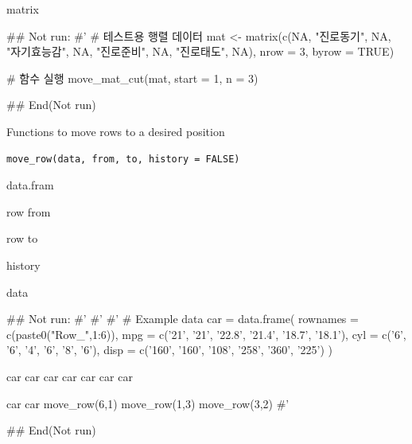 \documentclass[a4paper]{book}
\begin{document}
%
\begin{Value}
matrix
\end{Value}
%
\begin{Examples}
\begin{ExampleCode}

\#\# Not run: 
#'
# 테스트용 행렬 데이터
mat <- matrix(c(NA, "진로동기", NA, "자기효능감", NA,
    "진로준비", NA, "진로태도", NA), nrow = 3, byrow = TRUE)

# 함수 실행
move_mat_cut(mat, start = 1, n = 3)


## End(Not run)


\end{ExampleCode}
\end{Examples}
%
\begin{Description}
Functions to move rows to a desired position
\end{Description}
%
\begin{Usage}
\begin{verbatim}
move_row(data, from, to, history = FALSE)
\end{verbatim}
\end{Usage}
%
\begin{Arguments}
\begin{ldescription}
\item[\code{data}] data.fram

\item[\code{from}] row from

\item[\code{to}] row to

\item[\code{history}] history
\end{ldescription}
\end{Arguments}
%
\begin{Value}
data
\end{Value}
%
\begin{Examples}
\begin{ExampleCode}

\#\# Not run: 
#' #'
#' # Example data
car = data.frame(
  rownames = c(paste0("Row_",1:6)),
  mpg = c('21', '21', '22.8', '21.4', '18.7', '18.1'),
  cyl = c('6', '6', '4', '6', '8', '6'),
  disp = c('160', '160', '108', '258', '360', '225')
)

car
car%
car%
car%
car%
car%
car%

car
car%
  move_row(6,1)%
  move_row(1,3)%
  move_row(3,2)
#'

## End(Not run)


\end{ExampleCode}
\end{Examples}
\end{document}
